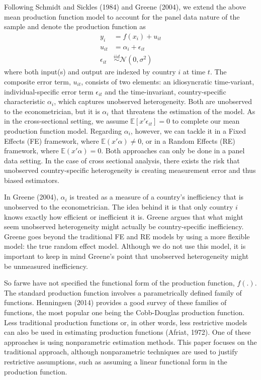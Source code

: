 \documentclass[12pt,a4paper]{article}\usepackage[]{graphicx}\usepackage[]{color}
\begin{document}
Following Schmidt and Sickles (1984) and Greene (2004), we extend the above mean production function model to account for the panel data nature of the sample and denote the production function as
$$
\begin{aligned}
y_i & = f(x_i) + u_{it} \\
u_{it} & = \alpha_i + \epsilon_{it} \\
\epsilon_{it} & \overset{iid}{\sim} \mathcal{N}(0, \sigma ^2)
\end{aligned}
$$
where both input(s) and output are indexed by country $i$ at time $t$. The composite error term, $u_{it}$, consists of two elements: an idiosyncratic time-variant, individual-specific error term $\epsilon_{it}$ and the time-invariant, country-specific characteristic $\alpha_i$, which captures unobserved heterogeneity. Both are unobserved to the econometrician, but it is $\alpha_i$ that threatens the estimation of the model. As in the cross-sectional setting, we assume $\mathbb{E}[x' \epsilon_{it}]=0$ to complete our mean production function model. Regarding $\alpha_i$, however, we can tackle it in a Fixed Effects (FE) framework, where $\mathbb{E}(x' \alpha) \neq 0$, or in a Random Effects (RE) framework, where $\mathbb{E}(x' \alpha) = 0$. Both approaches can only be done in a panel data setting. In the case of cross sectional analysis, there exists the risk that unobserved country-specific heterogeneity is creating measurement error and thus biased estimators. 

In Greene (2004), $\alpha_i$ is treated as a measure of a country's inefficiency that is unobserved to the econometrician. The idea behind it is that only country $i$ knows exactly how efficient or inefficient it is. Greene argues that what might seem unobserved heterogeneity might actually be country-specific inefficiency. Greene goes beyond the traditional FE and RE models by using a more flexible model: the true random effect model. Although we do not use this model, it is important to keep in mind Greene's point that unobserved heterogeneity might be unmeasured inefficiency.

So farwe have not specified the functional form of the production function, $f(.)$. The standard production function involves a parametrically defined family of functions. Henningsen (2014) provides a good survey of these families of functions, the most popular one being the Cobb-Douglas production function. Less traditional production functions or, in other words, less restrictive models can also be used in estimating production functions (Afriat, 1972). One of these approaches is using nonparametric estimation methods. This paper focuses on the traditional approach, although nonparametric techniques are used to justify restrictive assumptions, such as assuming a linear functional form in the production function.
\end{document}
